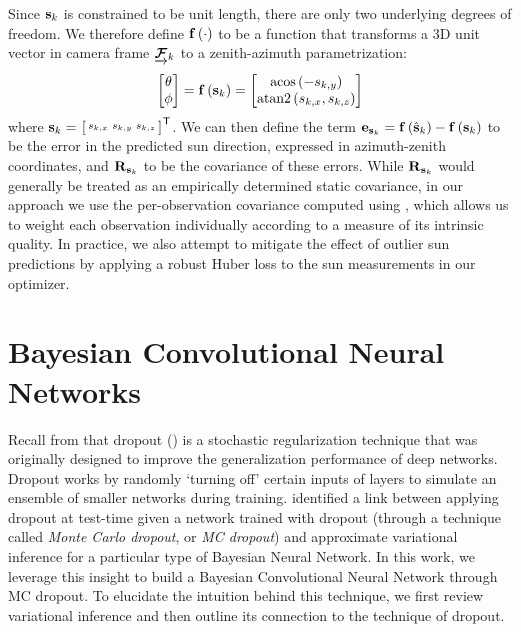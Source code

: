 Since $\boldsymbol{\mathbf{s}}_k$ is constrained to be unit length, there are only two underlying degrees of freedom.
We therefore define $\boldsymbol{\mathbf{f}}\left(\cdot\right)$ to be a function that transforms a 3D unit vector in camera frame $\underrightarrow{ \boldsymbol{\mathbf{\mathcal{F}}} }_{k}$ to a zenith-azimuth parametrization:
\begin{equation} \label{eq:vec-to-az-zen}
	\begin{bmatrix} \theta \\ \phi \end{bmatrix}
    = \boldsymbol{\mathbf{f}} \left( \boldsymbol{\mathbf{s}}_k \right)
    = \begin{bmatrix} \text{acos}\left( -s_{k,y} \right) \\ \text{atan2}\left(s_{k,x}, s_{k,z} \right) \end{bmatrix}
\end{equation}
where $\boldsymbol{\mathbf{s}}_k = \left.{\begin{bsmallmatrix} s_{k,x} & s_{k,y} & s_{k,z} \end{bsmallmatrix}}\right.^{\mkern-1.0mu\mathsf{T}}$.
We can then define the term $\boldsymbol{\mathbf{e}}_{\boldsymbol{\mathbf{s}}_k} = \boldsymbol{\mathbf{f}}\left(\hat{\boldsymbol{\mathbf{s}}}_k\right) - \boldsymbol{\mathbf{f}}\left(\boldsymbol{\mathbf{s}}_k\right)$ to be the error in the predicted sun direction, expressed in azimuth-zenith coordinates, and $\boldsymbol{\mathbf{R}}_{\boldsymbol{\mathbf{s}}_k}$ to be the covariance of these errors.
While $\boldsymbol{\mathbf{R}}_{\boldsymbol{\mathbf{s}}_k}$ would generally be treated as an empirically determined static covariance, in our approach we use the per-observation covariance computed using , which allows us to weight each observation individually according to a measure of its intrinsic quality.
In practice, we also attempt to mitigate the effect of outlier sun predictions by applying a robust Huber loss to the sun measurements in our optimizer.


\section{Bayesian Convolutional Neural Networks}

Recall from  that dropout () is a stochastic regularization technique that was originally designed to improve the generalization performance of deep networks. Dropout works by randomly `turning off' certain inputs of layers to simulate an ensemble of smaller networks during training. \cite{Gal2016CNN} identified a link between applying dropout at test-time given a network trained with dropout (through a technique called \textit{Monte Carlo dropout}, or \textit{MC dropout}) and approximate variational inference for a particular type of Bayesian Neural Network. In this work, we leverage this insight to build a Bayesian Convolutional Neural Network through MC dropout. To elucidate the intuition behind this technique, we first review variational inference and then outline its connection to the technique of dropout. 


